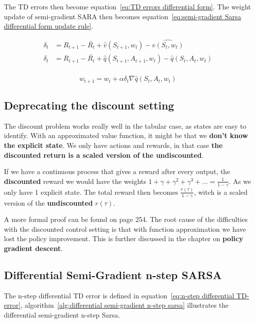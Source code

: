 The TD errors then become equation~\ref{eq:TD errors differential form}. The weight update of semi-gradient SARA then becomes equation~\ref{eq:semi-gradient Sarsa differential form update rule}.

\begin{equation}
\begin{split}
\delta_t & = R_{t+1} - \bar{R_t} + \hat{v}(S_{t+1}, w_t) - \hat{v(S_t, w_t)} \\
\delta_t & = R_{t+1} - \bar{R_t} + \hat{q}(S_{t+1}, A_{t+1}, w_t) - \hat{q}(S_t, A_t, w_t) \\
\end{split}
\label{eq:TD errors differential form}
\end{equation}

\begin{equation}
w_{t+1} = w_t + \alpha \delta_t \nabla \hat{q}(S_t, A_t, w_t)
\label{eq:semi-gradient Sarsa differential form update rule}
\end{equation}

\subsection{Deprecating the discount setting} 

The discount problem works really well in the tabular case, as states are easy to identify. With an approximated value function, it might be that we \textbf{don't know the explicit state}. We only have actions and rewards, in that case \textbf{the discounted return is a scaled version of the undiscounted}.

If we have a continuous process that gives a reward after every output, the \textbf{discounted} reward we would have the weights $1 + \gamma + \gamma^2 + \gamma^3 + ... = \frac{1}{1-\gamma}$. As we only have 1 explicit state. The total reward then becomes $\frac{r(\tau)}{1-\gamma}$, witch is a scaled version of the \textbf{undiscounted} $r(\tau)$. 

A more formal proof can be found on page 254. The root cause of the difficulties with the discounted control setting is that with function approximation we have lost the policy improvement. This is further discussed in the chapter on \textbf{policy gradient descent}.

\subsection{Differential Semi-Gradient n-step SARSA}
The n-step differential TD error is defined in equation~\ref{eq:n-step differential TD-error}, algorithm~\ref{alg:differential semi-gradient n-step sarsa} illustrates the differential semi-gradient n-step Sarsa.

